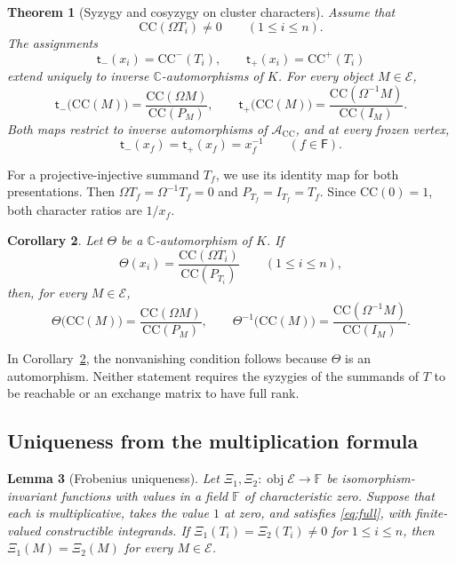 \documentclass[11pt]{amsart}
\numberwithin{equation}{section}
\newtheorem{theorem}{Theorem}[section]
\newtheorem{lemma}[theorem]{Lemma}
\newtheorem{corollary}[theorem]{Corollary}
\theoremstyle{definition}
\theoremstyle{remark}
\newcommand{\op}[1]{\operatorname{#1}}
\newcommand{\E}{\mathcal E}
\newcommand{\CC}{\mathrm{CC}}
\newcommand{\kk}{\mathbb C}
\begin{document}
\begin{theorem}[Syzygy and cosyzygy on cluster characters]\label{thm:main}
Assume that
\begin{equation}\label{eq:nonvanishing} \CC(\Omega T_i)\ne0\qquad(1\leq i\leq n).\end{equation}
The assignments
\[ \mathsf t_-(x_i)=\CC^-(T_i),\qquad \mathsf t_+(x_i)=\CC^+(T_i) \]
extend uniquely to inverse $\kk$-automorphisms of $K$. For every
object $M\in\E$,
\begin{equation}\label{eq:objectwise} \mathsf t_-\bigl(\CC(M)\bigr)=\frac{\CC(\Omega M)}{\CC(P_M)}, \qquad \mathsf t_+\bigl(\CC(M)\bigr)= \frac{\CC(\Omega^{-1}M)}{\CC(I_M)}.\end{equation}
Both maps restrict to inverse automorphisms of $\mathscr A_\CC$,
and at every frozen vertex,
\[ \mathsf t_-(x_f)=\mathsf t_+(x_f)=x_f^{-1}\qquad(f\in \mathsf F). \]

\end{theorem}

For a projective-injective summand $T_f$, we use its identity map for
both presentations. Then $\Omega T_f=\Omega^{-1}T_f=0$ and
$P_{T_f}=I_{T_f}=T_f$. Since $\CC(0)=1$, both character ratios
are $1/x_f$.

\begin{corollary}\label{cor:seed}
Let $\Theta$ be a $\kk$-automorphism of $K$. If
\[ \Theta(x_i)=\frac{\CC(\Omega T_i)}{\CC(P_{T_i})} \qquad(1\leq i\leq n), \]
then, for every $M\in\E$,
\[ \Theta\bigl(\CC(M)\bigr)=\frac{\CC(\Omega M)}{\CC(P_M)},\qquad \Theta^{-1}\bigl(\CC(M)\bigr)= \frac{\CC(\Omega^{-1}M)}{\CC(I_M)}. \]
\end{corollary}

In Corollary~\ref{cor:seed}, the nonvanishing condition follows because
$\Theta$ is an automorphism. Neither statement requires the syzygies
of the summands of $T$ to be reachable or an exchange matrix to have
full rank.

\subsection{Uniqueness from the multiplication formula}\label{sec:uniqueness}

\begin{lemma}[Frobenius uniqueness]\label{lem:uniqueness}
Let $\Xi_1,\Xi_2:\op{obj}\E\to\mathbb F$ be isomorphism-invariant functions
with values in a field $\mathbb F$ of characteristic zero. Suppose that each
is multiplicative, takes the value $1$ at zero, and satisfies
\eqref{eq:full}, with finite-valued constructible integrands. If
$\Xi_1(T_i)=\Xi_2(T_i)\ne0$ for $1\leq i\leq n$, 
then $\Xi_1(M)=\Xi_2(M)$ for every $M\in\E$.
\end{lemma}
\end{document}
